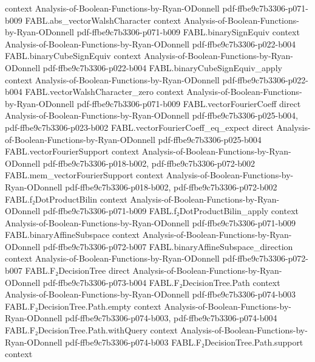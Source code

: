 \begin{theorem}
  {context}
  {Analysis-of-Boolean-Functions-by-Ryan-ODonnell}
  {pdf-ffbe9c7b3306-p071-b009}
\proofstep
  {FABL.abs_vectorWalshCharacter}
  {context}
  {Analysis-of-Boolean-Functions-by-Ryan-ODonnell}
  {pdf-ffbe9c7b3306-p071-b009}
\proofstep
  {FABL.binarySignEquiv}
  {context}
  {Analysis-of-Boolean-Functions-by-Ryan-ODonnell}
  {pdf-ffbe9c7b3306-p022-b004}
\proofstep
  {FABL.binaryCubeSignEquiv}
  {context}
  {Analysis-of-Boolean-Functions-by-Ryan-ODonnell}
  {pdf-ffbe9c7b3306-p022-b004}
\proofstep
  {FABL.binaryCubeSignEquiv_apply}
  {context}
  {Analysis-of-Boolean-Functions-by-Ryan-ODonnell}
  {pdf-ffbe9c7b3306-p022-b004}
\proofstep
  {FABL.vectorWalshCharacter_zero}
  {context}
  {Analysis-of-Boolean-Functions-by-Ryan-ODonnell}
  {pdf-ffbe9c7b3306-p071-b009}
\proofstep
  {FABL.vectorFourierCoeff}
  {direct}
  {Analysis-of-Boolean-Functions-by-Ryan-ODonnell}
  {pdf-ffbe9c7b3306-p025-b004,
    pdf-ffbe9c7b3306-p023-b002}
\proofstep
  {FABL.vectorFourierCoeff_eq_expect}
  {direct}
  {Analysis-of-Boolean-Functions-by-Ryan-ODonnell}
  {pdf-ffbe9c7b3306-p025-b004}
\proofstep
  {FABL.vectorFourierSupport}
  {context}
  {Analysis-of-Boolean-Functions-by-Ryan-ODonnell}
  {pdf-ffbe9c7b3306-p018-b002,
    pdf-ffbe9c7b3306-p072-b002}
\proofstep
  {FABL.mem_vectorFourierSupport}
  {context}
  {Analysis-of-Boolean-Functions-by-Ryan-ODonnell}
  {pdf-ffbe9c7b3306-p018-b002,
    pdf-ffbe9c7b3306-p072-b002}
\proofstep
  {FABL.f₂DotProductBilin}
  {context}
  {Analysis-of-Boolean-Functions-by-Ryan-ODonnell}
  {pdf-ffbe9c7b3306-p071-b009}
\proofstep
  {FABL.f₂DotProductBilin_apply}
  {context}
  {Analysis-of-Boolean-Functions-by-Ryan-ODonnell}
  {pdf-ffbe9c7b3306-p071-b009}
\proofstep
  {FABL.binaryAffineSubspace}
  {context}
  {Analysis-of-Boolean-Functions-by-Ryan-ODonnell}
  {pdf-ffbe9c7b3306-p072-b007}
\proofstep
  {FABL.binaryAffineSubspace_direction}
  {context}
  {Analysis-of-Boolean-Functions-by-Ryan-ODonnell}
  {pdf-ffbe9c7b3306-p072-b007}
\proofstep
  {FABL.F₂DecisionTree}
  {direct}
  {Analysis-of-Boolean-Functions-by-Ryan-ODonnell}
  {pdf-ffbe9c7b3306-p073-b004}
\proofstep
  {FABL.F₂DecisionTree.Path}
  {context}
  {Analysis-of-Boolean-Functions-by-Ryan-ODonnell}
  {pdf-ffbe9c7b3306-p074-b003}
\proofstep
  {FABL.F₂DecisionTree.Path.empty}
  {context}
  {Analysis-of-Boolean-Functions-by-Ryan-ODonnell}
  {pdf-ffbe9c7b3306-p074-b003,
    pdf-ffbe9c7b3306-p074-b004}
\proofstep
  {FABL.F₂DecisionTree.Path.withQuery}
  {context}
  {Analysis-of-Boolean-Functions-by-Ryan-ODonnell}
  {pdf-ffbe9c7b3306-p074-b003}
\proofstep
  {FABL.F₂DecisionTree.Path.support}
  {context}

\end{theorem}
